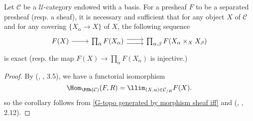 \begin{corollary}\label{G-topo generated by basis sheaf iff}
Let $\mathcal{C}$ be a $\mathscr{U}$-category endowed with a basis. For a presheaf $F$ to be a separated presheaf (resp. a sheaf), it is necessary and sufficient that for any object $X$ of $\mathcal{C}$ and for any covering $\{X_\alpha\to X\}$ of $X$, the following sequence
\[\begin{tikzcd}
F(X)\ar[r]&\prod_{\alpha}F(X_\alpha)\ar[r,shift left=3pt]\ar[r,shift right=3pt]&\prod_{\alpha,\beta}F(X_\alpha\times_XX_\beta)
\end{tikzcd}\]
is exact (resp. the map $F(X)\to \prod_\alpha F(X_\alpha)$ is injective.)
\end{corollary}
\begin{proof}
By (\cite{SGA4-1}, , 3.5), we have a functorial isomorphism 
\[\Hom_{\PSh(\mathcal{C})}(F,R)=\llim_{(X,u)\in\mathcal{C}_{/R}}F(X).\]
so the corollary follows from \cref{G-topo generated by morphism sheaf iff} and (\cite{SGA4-1}, , 2.12).
\end{proof}

